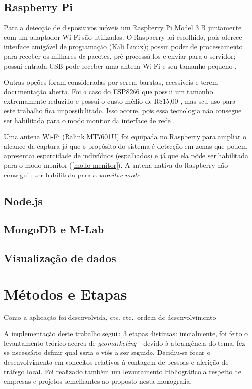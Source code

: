 \subsection{Raspberry Pi}
Para a detecção de dispositivos móveis um Raspberry Pi Model 3 B juntamente com um adaptador Wi-Fi são utilizados. O Raspberry foi escolhido,
pois oferece interface amigável de programação (Kali Linux); possui poder de processamento para receber os milhares de pacotes, pré-processá-los
e enviar para o servidor; possui entrada USB pode receber uma antena Wi-Fi e seu tamanho pequeno \cite{rpi2017}.

Outras opções foram consideradas por serem baratas, acessíveis e terem documentação aberta. Foi o caso do ESP8266 que possui um tamanho extremamente
reduzido e possui o custo médio de R\$15,00 \cite{Embarcados2015}, mas seu uso para este trabalho fica impossibilitado. Isso
ocorre, pois essa tecnologia não consegue ser habilitada para o modo monitor da interface de rede \cite{Puhl2016} \cite{Ferreira2016}.

Uma antena Wi-Fi (Ralink MT7601U) foi equipada no Raspberry para ampliar o alcance da captura já que o propósito do sistema é detecção em zonas que podem
apresentar esparcidade de indivíduos (espalhados) e já que ela pôde ser habilitada para o modo monitor (\autoref{modo-monitor}). A antena nativa
do Raspberry não conseguiu ser habilitada para o \emph{monitor mode}.

\subsection{Node.js}

\subsection{MongoDB e M-Lab}

\subsection{Visualização de dados}

\section{Métodos e Etapas}
Como a aplicação foi desenvolvida, etc. etc.. ordem de desenvolvimento

A implementação deste trabalho seguiu 3 etapas distintas: inicialmente, foi feito o levantamento teórico acerca de \emph{geomarketing} - devido à abrangência do tema, fez-se necessário definir qual seria o viés a ser seguido. Decidiu-se focar o desenvolvimento em conceitos relativos à contagem de pessoas e aferição de tráfego local. Foi realizado também um levantamento bibliográfico a respeito de empresas e projetos semelhantes ao proposto nesta monografia. 

